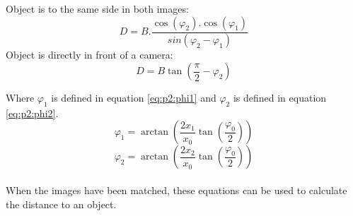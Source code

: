 Object is to the same side in both images:
\begin{equation} \label{eq:summary:2}
D = B.\frac{\cos(\varphi_2).\cos(\varphi_1)}{sin(\varphi_2 - \varphi_1)}
\end{equation}
Object is directly in front of a camera:
\begin{equation} \label{eq:summary:3}
D = B \tan\left(\frac{\pi}{2} - \varphi_{2}\right)
\end{equation}

Where $\varphi_1$ is defined in equation \eqref{eq:p2:phi1} and $\varphi_2$ is defined in equation \eqref{eq:p2:phi2}.
\begin{equation} \label{eq:p2:phi1}
\varphi_1 = \arctan\left(\frac{2x_1}{x_0}\tan\left(\frac{\varphi_0}{2}\right)\right)
\end{equation}
\begin{equation} \label{eq:p2:phi2}
\varphi_2 = \arctan\left(\frac{2x_2}{x_0}\tan\left(\frac{\varphi_0}{2}\right)\right)
\end{equation}
\\
When the images have been matched, these equations can be used to calculate the distance to an object.

